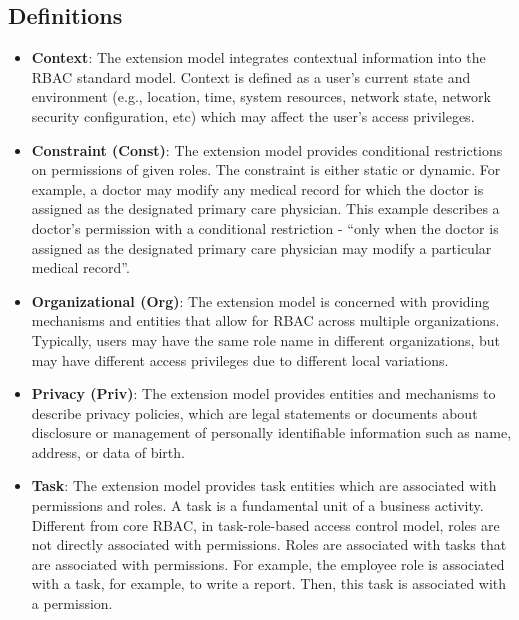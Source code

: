 \subsection{Definitions}

\begin{itemize}

  \item \textbf{Context}: The extension model integrates contextual information into the RBAC standard model. Context is defined as a user's current state and environment (e.g., location, time, system resources, network state, network security configuration, etc) which may affect the user's access privileges.

  \item \textbf{Constraint (Const)}: The extension model provides conditional restrictions on permissions of given roles. The constraint is either static or dynamic. For example, a doctor may modify any medical record for which the doctor is assigned as the designated primary care physician. This example describes a doctor's permission with a conditional restriction - ``only when the doctor is assigned as the designated primary care physician may modify a particular medical record''.

  \item \textbf{Organizational (Org)}: The extension model is concerned with providing mechanisms and entities that allow for RBAC across multiple organizations. Typically, users may have the same role name in different organizations, but may have different access privileges due to different local variations.
  
  \item \textbf{Privacy (Priv)}: The extension model provides entities and mechanisms to describe privacy policies, which are legal statements or documents about disclosure or management of personally identifiable information such as name, address, or data of birth.
  
  \item \textbf{Task}: The extension model provides task entities which are associated with permissions and roles. A task is a fundamental unit of a business activity. Different from core RBAC, in task-role-based access control model, roles are not directly associated with permissions. Roles are associated with tasks that are associated with permissions. For example, the employee role is associated with a task, for example, to write a report. Then, this task is associated with a permission.


\end{itemize}
